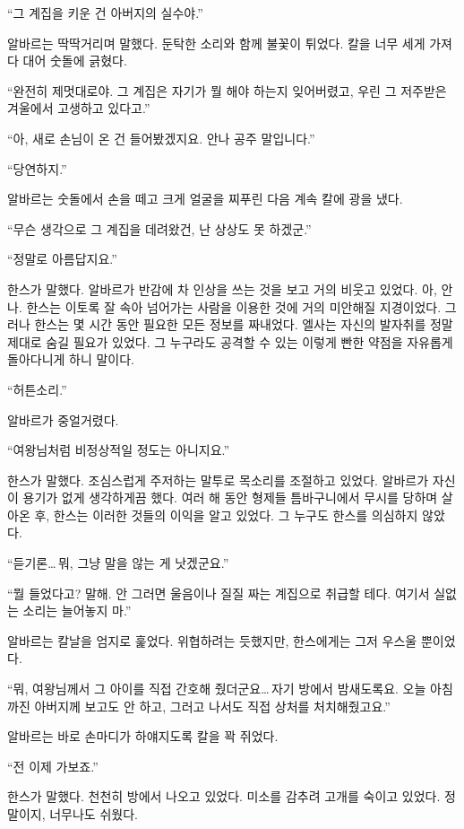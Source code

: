 ``그 계집을 키운 건 아버지의 실수야.''

알바르는 딱딱거리며 말했다. 둔탁한 소리와 함께 불꽃이 튀었다. 칼을 너무 세게 가져다 대어 숫돌에 긁혔다.

``완전히 제멋대로야. 그 계집은 자기가 뭘 해야 하는지 잊어버렸고, 우린 그 저주받은 겨울에서 고생하고 있다고.''

``아, 새로 손님이 온 건 들어봤겠지요. 안나 공주 말입니다.''

``당연하지.''

알바르는 숫돌에서 손을 떼고 크게 얼굴을 찌푸린 다음 계속 칼에 광을 냈다.

``무슨 생각으로 그 계집을 데려왔건, 난 상상도 못 하겠군.''

``정말로 아름답지요.''

한스가 말했다. 알바르가 반감에 차 인상을 쓰는 것을 보고 거의 비웃고 있었다. 아, 안나. 한스는 이토록 잘 속아 넘어가는 사람을 이용한 것에 거의 미안해질 지경이었다. 그러나 한스는 몇 시간 동안 필요한 모든 정보를 짜내었다. 엘사는 자신의 발자취를 정말 제대로 숨길 필요가 있었다. 그 누구라도 공격할 수 있는 이렇게 빤한 약점을 자유롭게 돌아다니게 하니 말이다.

``허튼소리.''

알바르가 중얼거렸다.

``여왕님처럼 비정상적일 정도는 아니지요.''

한스가 말했다. 조심스럽게 주저하는 말투로 목소리를 조절하고 있었다. 알바르가 자신이 용기가 없게 생각하게끔 했다. 여러 해 동안 형제들 틈바구니에서 무시를 당하며 살아온 후, 한스는 이러한 것들의 이익을 알고 있었다. 그 누구도 한스를 의심하지 않았다.

``듣기론\ldots\,뭐, 그냥 말을 않는 게 낫겠군요.''

``뭘 들었다고? 말해. 안 그러면 울음이나 질질 짜는 계집으로 취급할 테다. 여기서 실없는 소리는 늘어놓지 마.''

알바르는 칼날을 엄지로 훑었다. 위협하려는 듯했지만, 한스에게는 그저 우스울 뿐이었다.

``뭐, 여왕님께서 그 아이를 직접 간호해 줬더군요\ldots\,자기 방에서 밤새도록요. 오늘 아침까진 아버지께 보고도 안 하고, 그러고 나서도 직접 상처를 처치해줬고요.''

알바르는 바로 손마디가 하얘지도록 칼을 꽉 쥐었다.

``전 이제 가보죠.''

한스가 말했다. 천천히 방에서 나오고 있었다. 미소를 감추려 고개를 숙이고 있었다. 정말이지, 너무나도 쉬웠다.

\textbreak

